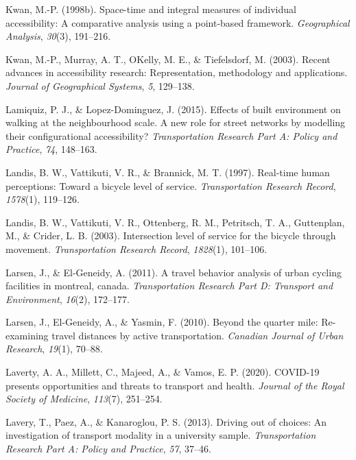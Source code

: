 \documentclass[
11pt, %
oneside, %
english, %
singlespacing, %
]{macthesis} %
\newlength{\cslhangindent}
\newenvironment{CSLReferences}[2] %
{\begin{list}{}{%
	\setlength{\itemindent}{0pt}
	\setlength{\leftmargin}{0pt}
	\setlength{\parsep}{0pt}
	\ifodd #1
	\setlength{\leftmargin}{\cslhangindent}
	\setlength{\itemindent}{-1\cslhangindent}
	\fi
	\setlength{\itemsep}{#2\baselineskip}}}
{\end{list}}
\begin{document}
\begin{CSLReferences}{1}{0}
Kwan, M.-P. (1998b). Space-time and integral measures of individual accessibility: A comparative analysis using a point-based framework. \emph{Geographical Analysis}, \emph{30}(3), 191--216.

Kwan, M.-P., Murray, A. T., OKelly, M. E., \& Tiefelsdorf, M. (2003). Recent advances in accessibility research: Representation, methodology and applications. \emph{Journal of Geographical Systems}, \emph{5}, 129--138.

Lamiquiz, P. J., \& Lopez-Dominguez, J. (2015). Effects of built environment on walking at the neighbourhood scale. A new role for street networks by modelling their configurational accessibility? \emph{Transportation Research Part A: Policy and Practice}, \emph{74}, 148--163.

Landis, B. W., Vattikuti, V. R., \& Brannick, M. T. (1997). Real-time human perceptions: Toward a bicycle level of service. \emph{Transportation Research Record}, \emph{1578}(1), 119--126.

Landis, B. W., Vattikuti, V. R., Ottenberg, R. M., Petritsch, T. A., Guttenplan, M., \& Crider, L. B. (2003). Intersection level of service for the bicycle through movement. \emph{Transportation Research Record}, \emph{1828}(1), 101--106.

Larsen, J., \& El-Geneidy, A. (2011). A travel behavior analysis of urban cycling facilities in montreal, canada. \emph{Transportation Research Part D: Transport and Environment}, \emph{16}(2), 172--177.

Larsen, J., El-Geneidy, A., \& Yasmin, F. (2010). Beyond the quarter mile: Re-examining travel distances by active transportation. \emph{Canadian Journal of Urban Research}, \emph{19}(1), 70--88.

Laverty, A. A., Millett, C., Majeed, A., \& Vamos, E. P. (2020). COVID-19 presents opportunities and threats to transport and health. \emph{Journal of the Royal Society of Medicine}, \emph{113}(7), 251--254.

Lavery, T., Paez, A., \& Kanaroglou, P. S. (2013). Driving out of choices: An investigation of transport modality in a university sample. \emph{Transportation Research Part A: Policy and Practice}, \emph{57}, 37--46.


\end{CSLReferences}
\end{document}
